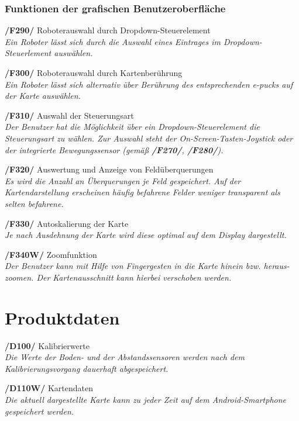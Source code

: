 \documentclass[10pt,a4paper]{article}
\let\oldsection\section
\renewcommand{\section}{\newpage \oldsection}
\begin{document}
			\subsubsection{Funktionen der grafischen Benutzeroberfläche}
				\begin{list}{}{\leftmargin=1cm}
					\item[\textbf{/F290/}] Roboterauswahl durch Dropdown-Steuerelement
						\\ \textsl{Ein Roboter lässt sich durch die Auswahl eines Eintrages im Dropdown-Steuerlement auswählen.}					
					\item[\textbf{/F300/}] Roboterauswahl durch Kartenberührung
						\\ \textsl{Ein Roboter lässt sich alternativ über Berührung des entsprechenden e-pucks auf der Karte auswählen.}	
					\item[\textbf{/F310/}] Auswahl der Steuerungsart
						\\ \textsl{Der Benutzer hat die Möglichkeit über ein Dropdown-Steuerelement die Steuerungsart zu wählen. Zur Auswahl
							steht der On-Screen-Tasten-Joystick oder der  integrierte Bewegungssensor (gemäß \textbf{/F270/},
							\textbf{/F280/}).}
					\item[\textbf{/F320/}] Auswertung und Anzeige von Feldüberquerungen
						\\ \textsl{Es wird die Anzahl an Überquerungen je Feld gespeichert. Auf der Kartendarstellung erscheinen häufig befahrene
							Felder weniger transparent als selten befahrene.}	
					\item[\textbf{/F330/}] Autoskalierung der Karte
						\\ \textsl{Je nach Ausdehnung der Karte wird diese optimal auf dem Display dargestellt.}							
					\item[\textbf{/F340W/}] Zoomfunktion
						\\ \textsl{Der Benutzer kann mit Hilfe von Fingergesten in die Karte hinein bzw. heraus-zoomen. Der Kartenausschnitt
							kann hierbei verschoben werden.}										
				\end{list}		
	\section{Produktdaten}
		\begin{list}{}{\leftmargin=1cm}
			\item[\textbf{/D100/}] Kalibrierwerte
				\\ \textsl{Die Werte der Boden- und der Abstandssensoren werden nach dem Kalibrierungsvorgang dauerhaft abgespeichert.}
		\end{list}
		\begin{list}{}{\leftmargin=1cm}
			\item[\textbf{/D110W/}] Kartendaten
				\\ \textsl{Die aktuell dargestellte Karte kann zu jeder Zeit auf dem Android-Smartphone gespeichert werden.}
		\end{list}
		
\end{document}
